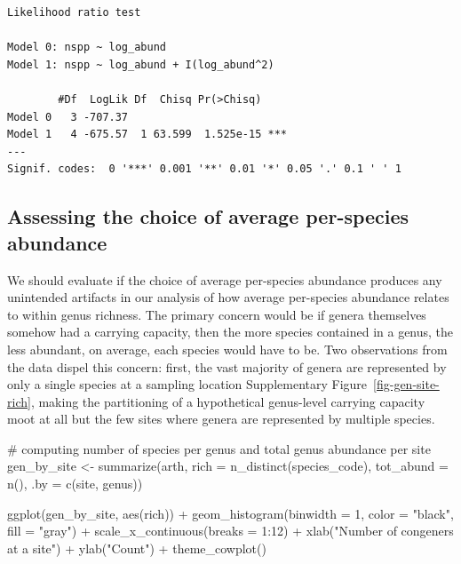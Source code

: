 \documentclass[
  letterpaper,
  DIV=11,
  numbers=noendperiod]{scrartcl}
\newenvironment{Shaded}{\begin{snugshade}}{\end{snugshade}}
\newcommand{\AttributeTok}[1]{\textcolor[rgb]{0.40,0.45,0.13}{#1}}
\newcommand{\CommentTok}[1]{\textcolor[rgb]{0.37,0.37,0.37}{#1}}
\newcommand{\DecValTok}[1]{\textcolor[rgb]{0.68,0.00,0.00}{#1}}
\newcommand{\FunctionTok}[1]{\textcolor[rgb]{0.28,0.35,0.67}{#1}}
\newcommand{\NormalTok}[1]{\textcolor[rgb]{0.00,0.23,0.31}{#1}}
\newcommand{\OtherTok}[1]{\textcolor[rgb]{0.00,0.23,0.31}{#1}}
\newcommand{\SpecialCharTok}[1]{\textcolor[rgb]{0.37,0.37,0.37}{#1}}
\newcommand{\StringTok}[1]{\textcolor[rgb]{0.13,0.47,0.30}{#1}}
\begin{document}
\begin{verbatim}
Likelihood ratio test

Model 0: nspp ~ log_abund
Model 1: nspp ~ log_abund + I(log_abund^2)

        #Df  LogLik Df  Chisq Pr(>Chisq)    
Model 0   3 -707.37                         
Model 1   4 -675.57  1 63.599  1.525e-15 ***
---
Signif. codes:  0 '***' 0.001 '**' 0.01 '*' 0.05 '.' 0.1 ' ' 1
\end{verbatim}

\subsection{Assessing the choice of average per-species
abundance}\label{sec-tot-abund}

We should evaluate if the choice of average per-species abundance
produces any unintended artifacts in our analysis of how average
per-species abundance relates to within genus richness. The primary
concern would be if genera themselves somehow had a carrying capacity,
then the more species contained in a genus, the less abundant, on
average, each species would have to be. Two observations from the data
dispel this concern: first, the vast majority of genera are represented
by only a single species at a sampling location Supplementary
Figure~\ref{fig-gen-site-rich}, making the partitioning of a
hypothetical genus-level carrying capacity moot at all but the few sites
where genera are represented by multiple species.

\begin{Shaded}
\begin{Highlighting}[]
\CommentTok{\# computing number of species per genus and total genus abundance per site}
\NormalTok{gen\_by\_site }\OtherTok{\textless{}{-}} \FunctionTok{summarize}\NormalTok{(arth, }
          \AttributeTok{rich =} \FunctionTok{n\_distinct}\NormalTok{(species\_code),}
          \AttributeTok{tot\_abund =} \FunctionTok{n}\NormalTok{(),}
          \AttributeTok{.by =} \FunctionTok{c}\NormalTok{(site, genus))}

\FunctionTok{ggplot}\NormalTok{(gen\_by\_site, }\FunctionTok{aes}\NormalTok{(rich)) }\SpecialCharTok{+}
    \FunctionTok{geom\_histogram}\NormalTok{(}\AttributeTok{binwidth =} \DecValTok{1}\NormalTok{, }\AttributeTok{color =} \StringTok{"black"}\NormalTok{, }\AttributeTok{fill =} \StringTok{"gray"}\NormalTok{) }\SpecialCharTok{+}
    \FunctionTok{scale\_x\_continuous}\NormalTok{(}\AttributeTok{breaks =} \DecValTok{1}\SpecialCharTok{:}\DecValTok{12}\NormalTok{) }\SpecialCharTok{+}
    \FunctionTok{xlab}\NormalTok{(}\StringTok{"Number of congeners at a site"}\NormalTok{) }\SpecialCharTok{+}
    \FunctionTok{ylab}\NormalTok{(}\StringTok{"Count"}\NormalTok{) }\SpecialCharTok{+}
    \FunctionTok{theme\_cowplot}\NormalTok{()}
\end{Highlighting}
\end{Shaded}
\end{document}
